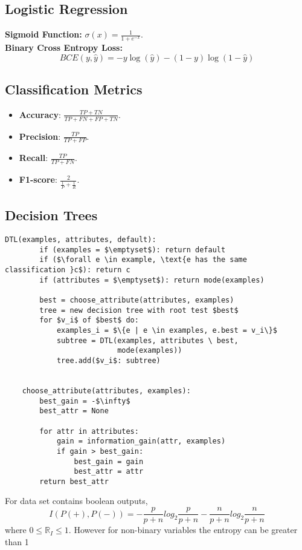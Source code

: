 \documentclass[twocolumn, 10pt]{article}
\begin{document}
\subsection*{Logistic Regression}
\textbf{Sigmoid Function:} $\sigma(x) = \frac{1}{1 + e^{-x}}$. \\
\textbf{Binary Cross Entropy Loss:}
\begin{equation}
    BCE(y, \hat{y}) = -y\log(\hat{y}) - (1 - y)\log(1 - \hat{y})
\end{equation}

\subsection*{Classification Metrics}
\begin{itemize}
    \item \textbf{Accuracy}: $\frac{TP + TN}{TP + FN + FP + TN}$.
    \item \textbf{Precision}: $\frac{TP}{TP + FP}$.
    \item \textbf{Recall}: $\frac{TP}{TP + FN}$.
    \item \textbf{F1-score}: $\frac{2}{\frac{1}{P} + \frac{1}{R}}$.
\end{itemize}

\subsection*{Decision Trees}
\begin{lstlisting}[mathescape=true]
    DTL(examples, attributes, default):
        if (examples = $\emptyset$): return default
        if ($\forall e \in example, \text{e has the same classification }c$): return c
        if (attributes = $\emptyset$): return mode(examples)

        best = choose_attribute(attributes, examples)
        tree = new decision tree with root test $best$
        for $v_i$ of $best$ do:
            examples_i = $\{e | e \in examples, e.best = v_i\}$
            subtree = DTL(examples, attributes \ best, 
                          mode(examples))
            tree.add($v_i$: subtree)


    choose_attribute(attributes, examples):
        best_gain = -$\infty$
        best_attr = None
    
        for attr in attributes:
            gain = information_gain(attr, examples)
            if gain > best_gain:
                best_gain = gain
                best_attr = attr
        return best_attr
    \end{lstlisting}
    For data set contains boolean outputs, 
    \[I(P(+), P(-)) = -\frac{p}{p + n}log_2 \frac{p}{p + n} - \frac{n}{p+n}log_2\frac{n}{p+n}\]
    where $0 \leq \mathbb{R}_I \leq 1$. However for non-binary variables the entropy can be greater than 1
\end{document}

